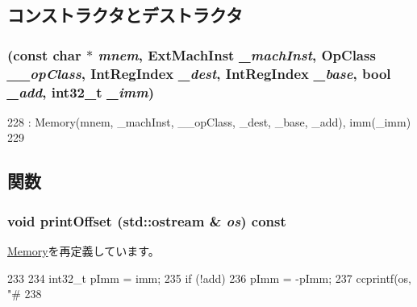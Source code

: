 \subsection{コンストラクタとデストラクタ}
\hypertarget{classArmISA_1_1MemoryImm_ae3e22d0db45880b32302c4be4b7f93dd}{
\subsubsection[{MemoryImm}]{ (const char $\ast$ {\em mnem}, \/  {\bf ExtMachInst} {\em \_\-machInst}, \/  OpClass {\em \_\-\_\-opClass}, \/  {\bf IntRegIndex} {\em \_\-dest}, \/  {\bf IntRegIndex} {\em \_\-base}, \/  bool {\em \_\-add}, \/  int32\_\-t {\em \_\-imm})}}
\label{classArmISA_1_1MemoryImm_ae3e22d0db45880b32302c4be4b7f93dd}



\begin{DoxyCode}
228         : Memory(mnem, _machInst, __opClass, _dest, _base, _add), imm(_imm)
229     {}
\end{DoxyCode}


\subsection{関数}
\hypertarget{classArmISA_1_1MemoryImm_a7fdadf47668a31b2e7b99f0cc36c5d4f}{
\subsubsection[{printOffset}]{\setlength{\rightskip}{0pt plus 5cm}void printOffset (std::ostream \& {\em os}) const}}
\label{classArmISA_1_1MemoryImm_a7fdadf47668a31b2e7b99f0cc36c5d4f}


\hyperlink{classArmISA_1_1Memory_a8ff7c6b5299bfe7b627754684ca9c387}{Memory}を再定義しています。


\begin{DoxyCode}
233     {
234         int32_t pImm = imm;
235         if (!add)
236             pImm = -pImm;
237         ccprintf(os, "#%
238     }
\end{DoxyCode}


